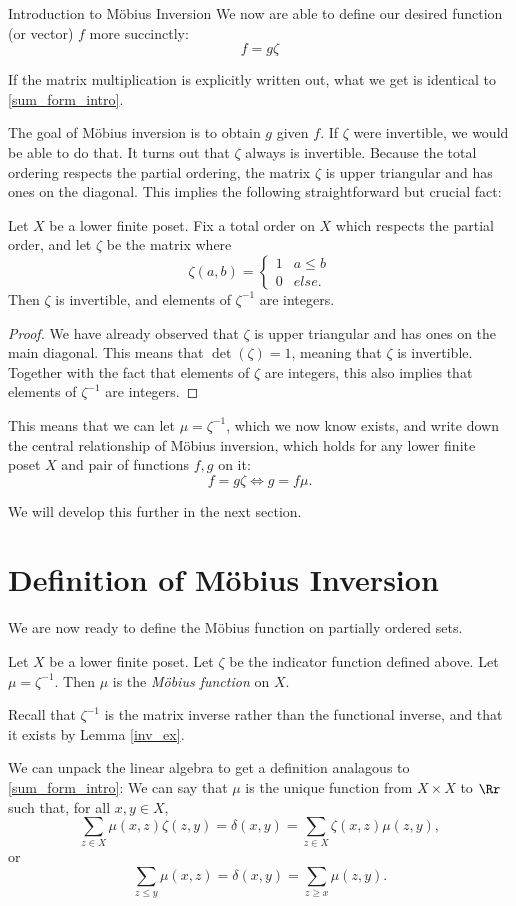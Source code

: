 \documentclass[12pt]{pom_thesis}
\begin{document}
\begin{chapter}{Introduction to M\"obius Inversion}
We now are able to define our desired function (or vector) $f$ more succinctly:
\[
f = g \zeta
\]

If the matrix multiplication is explicitly written out, what we get is identical to \eqref{sum_form_intro}.

The goal of M\"obius inversion is to obtain $g$ given $f$. If $\zeta$ were invertible, we would be able to do that. It turns out that $\zeta$ always is invertible. Because the total ordering respects the partial ordering, the matrix $\zeta$ is upper triangular and has ones on the diagonal. This implies the following straightforward but crucial fact:
\begin{lemma}\label{inv_ex}
Let $X$ be a lower finite poset. Fix a total order on $X$ which respects the partial order, and let $\zeta$ be the matrix where 
\[
\zeta(a,b) = \begin{cases}1 & a \leq b \\ 0 & else. \end{cases}
\]
Then $\zeta$ is invertible, and elements of $\zeta^{-1}$ are integers.
\end{lemma}
\begin{proof}
We have already observed that $\zeta$ is upper triangular and has ones on the main diagonal. This means that $\det(\zeta) = 1$, meaning that $\zeta$ is invertible. Together with the fact that elements of $\zeta$ are integers, this also implies that elements of $\zeta^{-1}$ are integers.
\end{proof}

This means that we can let $\mu=\zeta^{-1}$, which we now know exists, and write down the central relationship of M\"obius inversion, which holds for any lower finite poset $X$ and pair of functions $f,g$ on it:
\[
f = g \zeta \iff g = f \mu.
\]

We will develop this further in the next section.

\section{Definition of M\"obius Inversion}
We are now ready to define the M\"obius function on partially ordered sets.
\begin{defn}\label{def_mob_pos}
Let $X$ be a lower finite poset. Let $\zeta$ be the indicator function defined above. Let $\mu = \zeta^{-1}$. Then $\mu$ is the \emph{M\"obius function} on $X$.
\end{defn}
\begin{rmk}
Recall that $\zeta^{-1}$ is the matrix inverse rather than the functional inverse, and that it exists by Lemma \ref{inv_ex}.
\end{rmk}
\begin{rmk}\label{sum_form}
We can unpack the linear algebra to get a definition analagous to \eqref{sum_form_intro}: We can say that $\mu$ is the unique function from $X\times X$ to $\Rr$ such that, for all $x,y \in X$,
\[
\sum_{z \in X} \mu(x,z)\zeta(z,y) = \delta(x,y) = \sum_{z \in X} \zeta(x,z)\mu(z,y),
\]
or
\[
\sum_{z \leq y} \mu(x,z) = \delta(x,y) = \sum_{z \geq x} \mu(z,y).
\]
\end{rmk}


\end{chapter}
\end{document}
